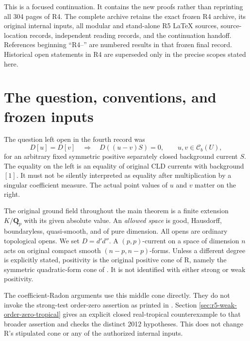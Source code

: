 \documentclass[11pt,a4paper]{article}
\numberwithin{equation}{section}
\theoremstyle{definition}
\theoremstyle{remark}
\begin{document}
This is a focused continuation. It contains the new proofs rather
than reprinting all 304 pages of R4. The complete archive retains
the exact frozen R4 archive, its original internal inputs, all
modular and stand-alone R5 LaTeX sources, source-location records,
independent reading records, and the continuation handoff.
References beginning ``R4--'' are numbered results in that frozen
final record. Historical open statements in R4 are superseded only
in the precise scopes stated here.

\tableofcontents
\clearpage

\section{The question, conventions, and frozen inputs}
\label{sec:r5-inputs}

The question left open in the fourth record was
\begin{equation}
 D[u]=D[v]\quad\Longrightarrow\quad D((u-v)S)=0,
 \qquad u,v\in\mathcal C_b(U),
 \label{eq:r5-main-question}
\end{equation}
for an arbitrary fixed symmetric positive separately closed
background current $S$. The equality on the left is an equality
of original CLD currents with background $[1]$. It must not be
silently interpreted as equality after multiplication by a
singular coefficient measure. The actual point values of $u$
and $v$ matter on the right.

The original ground field throughout the main theorem is a finite
extension $K/\mathbf Q_p$ with its given absolute value. An
\emph{allowed space} is good, Hausdorff, boundaryless, quasi-smooth,
and of pure dimension. All opens are ordinary topological opens.
We set $D=d'd''$. A $(p,p)$-current on a space of dimension $n$
acts on original compact smooth $(n-p,n-p)$-forms. Unless a
different degree is explicitly stated, positivity is the original
positive cone of R, namely the symmetric quadratic-form cone of
\cite[Definition 5.1.1(c) and \S5.4]{CLD12}. It is not identified
with either strong or weak positivity.

The coefficient-Radon arguments use this middle cone directly.
They do not invoke the strong-test order-zero assertion as printed
in \cite[Proposition 7.2.9]{CLD25}. Section
\ref{sec:r5-weak-order-zero-tropical} gives an explicit closed
real-tropical counterexample to that broader assertion and checks
the distinct 2012 hypotheses. This does not change R's stipulated
cone or any of the authorized internal inputs.
\end{document}
